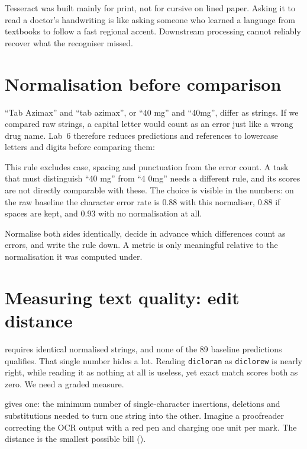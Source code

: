 \begin{intuition}
Tesseract was built mainly for print, not for cursive on lined paper. Asking it to read a doctor's handwriting is like asking someone who learned a language from textbooks to follow a fast regional accent. Downstream processing cannot reliably recover what the recogniser missed.
\end{intuition}

\section{Normalisation before comparison}

``Tab Azimax'' and ``tab azimax'', or ``40 mg'' and ``40mg'', differ as strings. If we compared raw strings, a capital letter would count as an error just like a wrong drug name. Lab~6 therefore reduces predictions and references to lowercase letters and digits before comparing them:



This rule excludes case, spacing and punctuation from the error count. A task that must distinguish ``40 mg'' from ``4 0mg'' needs a different rule, and its scores are not directly comparable with these. The choice is visible in the numbers: on the raw baseline the character error rate is 0.88 with this normaliser, 0.88 if spaces are kept, and 0.93 with no normalisation at all.

\begin{keyidea}
Normalise both sides identically, decide in advance which differences count as errors, and write the rule down. A metric is only meaningful relative to the normalisation it was computed under.
\end{keyidea}

\section{Measuring text quality: edit distance}

 requires identical normalised strings, and none of the 89 baseline predictions qualifies. That single number hides a lot. Reading \texttt{dicloran} as \texttt{diclorew} is nearly right, while reading it as nothing at all is useless, yet exact match scores both as zero. We need a graded measure.

 gives one: the minimum number of single-character insertions, deletions and substitutions needed to turn one string into the other. Imagine a proofreader correcting the OCR output with a red pen and charging one unit per mark. The distance is the smallest possible bill ().

